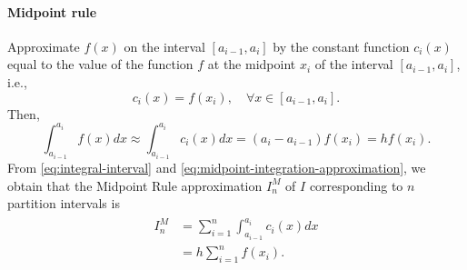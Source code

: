 \paragraph{Midpoint rule}
Approximate $ f(x) $ on the interval $ [a_{i-1}, a_i] $ by the constant function
    $ c_i(x) $ equal to the value of the function $ f $ at the midpoint $ x_i $
    of the interval $ [a_{i-1}, a_i] $, i.e.,
\begin{equation}
    c_i(x) = f(x_i), \quad \forall x \in [a_{i-1}, a_i].
    \label{eq:midpoint-constant-function}
\end{equation}
Then,
\begin{equation}
    \int_{a_{i-1}}^{a_i} f(x) dx \approx \int_{a_{i-1}}^{a_i} c_i(x) dx =
        (a_i - a_{i-1}) f(x_i) = h f(x_i).
    \label{eq:midpoint-integration-approximation}
\end{equation}
From \eqref{eq:integral-interval} and
    \eqref{eq:midpoint-integration-approximation}, we obtain that the Midpoint
    Rule approximation $ I_n^M $ of $ I $ corresponding to $ n $ partition
    intervals is
\begin{align}
    \begin{split}
        I_n^M &= \sum_{i=1}^{n} \int_{a_{i-1}}^{a_i} c_i(x) dx \\
              &=  h \sum_{i=1}^{n} f(x_i).
        \label{eq:midpoint-rule-sum}
    \end{split}
\end{align}

